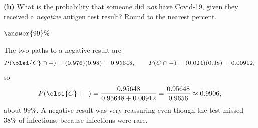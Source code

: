 \documentclass[12pt]{ximera}
\begin{document}
\begin{problem}
\begin{prompt}
\textbf{(b)} What is the probability that someone did \emph{not} have Covid-19, given
they received a \emph{negative} antigen test result? Round to the nearest percent.

$\answer{99}\%$

\begin{feedback}
The two paths to a negative result are
\[
P\!\left(\olsi{C}\cap -\right)=(0.976)(0.98)=0.95648, \qquad
P(C\cap -)=(0.024)(0.38)=0.00912,
\]
so
\[
P\!\left(\olsi{C}\mid -\right)=\frac{0.95648}{0.95648+0.00912}=\frac{0.95648}{0.9656}\approx 0.9906,
\]
about $99\%$. A negative result was very reassuring even though the test missed $38\%$
of infections, because infections were rare.
\end{feedback}
\end{prompt}
\end{problem}
\end{document}
